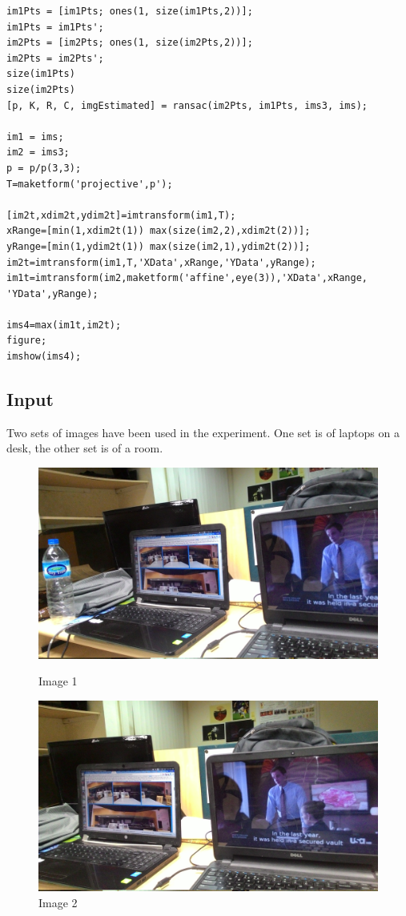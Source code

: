 \documentclass[12pt]{article}
\begin{document}
\begin{lstlisting}
im1Pts = [im1Pts; ones(1, size(im1Pts,2))];
im1Pts = im1Pts';
im2Pts = [im2Pts; ones(1, size(im2Pts,2))];
im2Pts = im2Pts';
size(im1Pts)
size(im2Pts)
[p, K, R, C, imgEstimated] = ransac(im2Pts, im1Pts, ims3, ims);

im1 = ims;
im2 = ims3;
p = p/p(3,3);
T=maketform('projective',p');

[im2t,xdim2t,ydim2t]=imtransform(im1,T);
xRange=[min(1,xdim2t(1)) max(size(im2,2),xdim2t(2))];
yRange=[min(1,ydim2t(1)) max(size(im2,1),ydim2t(2))];
im2t=imtransform(im1,T,'XData',xRange,'YData',yRange);
im1t=imtransform(im2,maketform('affine',eye(3)),'XData',xRange,
'YData',yRange);

ims4=max(im1t,im2t);
figure;
imshow(ims4);
\end{lstlisting}

\subsection{Input}
Two sets of images have been used in the experiment. One set is of laptops on a desk, the other set is of a room.
\begin{figure}[h]
\centering
\begin{minipage}{0.6\textwidth}
\centering
\includegraphics[scale = 0.067]{pt1.jpg}
\caption{Image 1}
\label{fig:Image 1}
\end{minipage}%
\begin{minipage}{.5\textwidth}
\centering
\includegraphics[scale = 0.067]{pt2.jpg}
\caption{Image 2}
\label{fig:Image 2}
\end{minipage}%
\end{figure}
\end{document}
